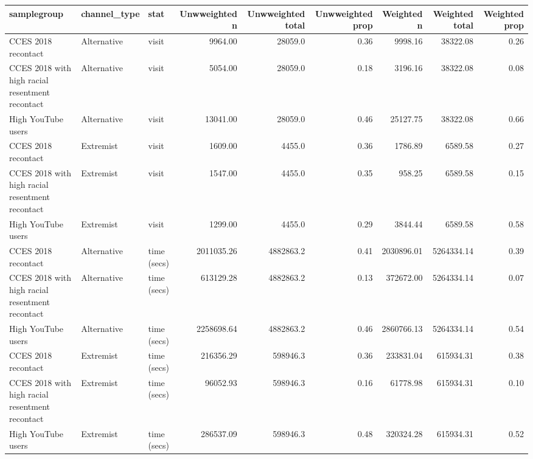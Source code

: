 \begin{table}[H]
\centering
\begin{tabular}[t]{lllrrrrrr}
\toprule
samplegroup & channel\_type & stat & Unwweighted n & Unwweighted total & Unwweighted prop & Weighted n & Weighted total & Weighted prop\\
\midrule
CCES 2018 recontact & Alternative & visit & 9964.00 & 28059.0 & 0.36 & 9998.16 & 38322.08 & 0.26\\
CCES 2018 with high racial resentment recontact & Alternative & visit & 5054.00 & 28059.0 & 0.18 & 3196.16 & 38322.08 & 0.08\\
High YouTube users & Alternative & visit & 13041.00 & 28059.0 & 0.46 & 25127.75 & 38322.08 & 0.66\\
CCES 2018 recontact & Extremist & visit & 1609.00 & 4455.0 & 0.36 & 1786.89 & 6589.58 & 0.27\\
CCES 2018 with high racial resentment recontact & Extremist & visit & 1547.00 & 4455.0 & 0.35 & 958.25 & 6589.58 & 0.15\\
\addlinespace
High YouTube users & Extremist & visit & 1299.00 & 4455.0 & 0.29 & 3844.44 & 6589.58 & 0.58\\
CCES 2018 recontact & Alternative & time (secs) & 2011035.26 & 4882863.2 & 0.41 & 2030896.01 & 5264334.14 & 0.39\\
CCES 2018 with high racial resentment recontact & Alternative & time (secs) & 613129.28 & 4882863.2 & 0.13 & 372672.00 & 5264334.14 & 0.07\\
High YouTube users & Alternative & time (secs) & 2258698.64 & 4882863.2 & 0.46 & 2860766.13 & 5264334.14 & 0.54\\
CCES 2018 recontact & Extremist & time (secs) & 216356.29 & 598946.3 & 0.36 & 233831.04 & 615934.31 & 0.38\\
\addlinespace
CCES 2018 with high racial resentment recontact & Extremist & time (secs) & 96052.93 & 598946.3 & 0.16 & 61778.98 & 615934.31 & 0.10\\
High YouTube users & Extremist & time (secs) & 286537.09 & 598946.3 & 0.48 & 320324.28 & 615934.31 & 0.52\\
\bottomrule
\end{tabular}
\end{table}

